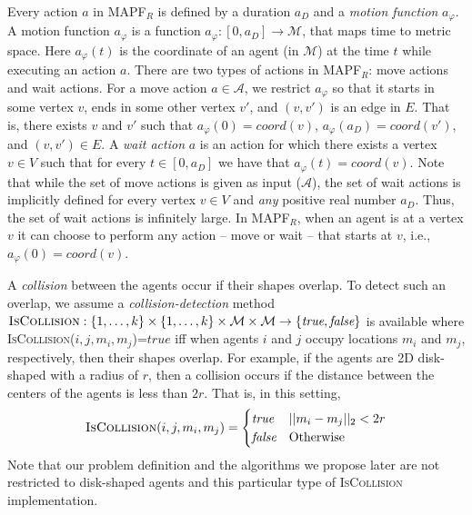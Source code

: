 \documentclass[review]{elsarticle}
\newcommand\roni[1]{\nb{\textbf{Roni:}}{green}{#1}}
\newcommand\dor[1]{\nb{\textbf{Dor:}}{Fuchsia}{#1}}
\newcommand{\mapfr}{\ac{MAPF}$_R$\xspace}
\newcommand{\true}{\textit{true}\xspace}
\newcommand{\false}{\textit{false}\xspace}
\newcommand{\coord}{\textit{coord}\xspace}
\newcommand{\iscollision}{\textsc{IsCollision}\xspace}
\begin{document}
Every action $a$ in \mapfr is defined by a duration $a_D$ and a \emph{motion function} $a_\varphi$. 
A motion function $a_\varphi$ is a function $a_\varphi:[0,a_D]\rightarrow \mathcal{M}$, that maps time to metric space. Here $a_\varphi(t)$ is the coordinate of an agent (in $\mathcal{M}$) at the time $t$ while executing an action $a$.
There are two types of actions in \mapfr: move actions and wait actions. 
For a move action $a\in \mathcal{A}$, we restrict $a_\varphi$ so that it starts in some vertex $v$, 
ends in some other vertex $v'$, and $(v,v')$ is an edge in $E$. 
That is, there exists $v$ and $v'$ such that $a_\varphi(0)=\coord(v)$, $a_\varphi(a_D)=\coord(v')$, and $(v,v')\in E$.
A \emph{wait action} $a$ is an action for which there exists a vertex $v\in V$ such that for every $t\in [0,a_D]$ 
we have that $a_\varphi(t)=\coord(v)$. Note that while the set of move actions is given as input ($\mathcal{A}$), 
the set of wait actions is implicitly defined for every vertex $v\in V$ and \emph{any} positive real number $a_D$. 
Thus, the set of wait actions is infinitely large.
In \mapfr, when an agent is at a vertex $v$ it can choose to perform any action -- move or wait -- that starts at $v$, i.e., $a_\varphi(0)=\coord(v)$. 

A \emph{collision} between the agents occur if their shapes overlap. To detect such an overlap, we assume a \emph{collision-detection} method $\iscollision:\{1,\ldots,k\}\times \{1,\ldots,k\}
\times \mathcal{M}\times \mathcal{M}
\rightarrow \{\true,\false\}$ 
is available where \iscollision($i,j,m_i,m_j$)=$\true$ iff when agents $i$ and $j$ occupy locations $m_i$ and $m_j$, respectively, then their shapes overlap. For example, if the agents are 2D disk-shaped with a radius of $r$, then a collision occurs if the distance between the centers of the agents is less than $2r$. That is, in this setting, 
\begin{equation}
\iscollision(i,j, m_i,m_j)=
\begin{cases}
\true & ||m_i-m_j||_2 < 2r \\
\false & \text{Otherwise}
\end{cases}
\end{equation}
Note that our problem definition and the algorithms we propose later are not restricted to disk-shaped agents and this particular type of \iscollision implementation. 
\end{document}
